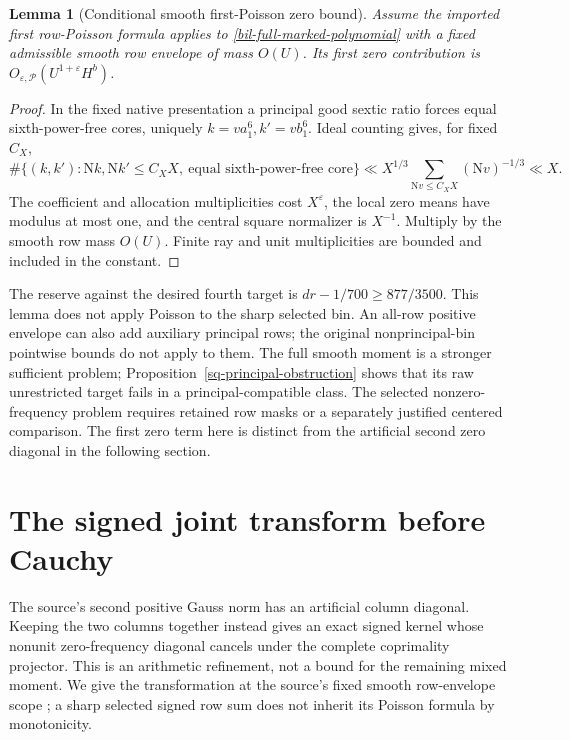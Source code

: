 \documentclass[11pt]{article}
\newtheorem{lemma}[theorem]{Lemma}
\theoremstyle{definition}
\newcommand{\N}{\mathrm N}
\newcommand{\eps}{\varepsilon}
\begin{document}
\begin{lemma}[Conditional smooth first-Poisson zero bound]
\label{bil-first-zero-bound}
Assume the imported first row-Poisson formula applies to
\eqref{bil-full-marked-polynomial} with a fixed admissible smooth row
envelope of mass $O(U)$. Its first zero contribution is
$O_{\eps,\mathcal P}(U^{1+\eps}H^b)$.
\end{lemma}
\begin{proof}
In the fixed native presentation a principal good sextic ratio forces
equal sixth-power-free cores, uniquely $k=v a_1^6,k'=v b_1^6$.
Ideal counting gives, for fixed $C_X$,
\[
 \#\{(k,k'): \N k,\N k'\le C_X X,\ \text{equal sixth-power-free core}\}
 \ll X^{1/3}\sum_{\N v\le C_X X}(\N v)^{-1/3}\ll X.
\]
The coefficient and allocation multiplicities cost $X^\eps$, the local
zero means have modulus at most one, and the central square normalizer
is $X^{-1}$. Multiply by the smooth row mass $O(U)$.
Finite ray and unit multiplicities are bounded and included in the constant.
\end{proof}
The reserve against the desired fourth target is
$dr-1/700\ge877/3500$. This lemma does not apply Poisson to the sharp
selected bin. An all-row positive envelope can also add auxiliary
principal rows; the original nonprincipal-bin pointwise bounds do not
apply to them. The full smooth moment is a stronger sufficient problem;
Proposition~\ref{sq-principal-obstruction} shows that its raw unrestricted
target fails in a principal-compatible class. The selected nonzero-frequency
problem requires retained row masks or a separately justified centered comparison.
The first zero term here is distinct from the artificial second zero
diagonal in the following section.

\section{The signed joint transform before Cauchy}
\label{sj-sec-transform}
The source's second positive Gauss norm has an artificial column diagonal.
Keeping the two columns together instead gives an exact signed kernel whose
nonunit zero-frequency diagonal cancels under the complete coprimality
projector.  This is an arithmetic refinement, not a bound for the remaining
mixed moment.  We give the transformation at the source's fixed smooth
row-envelope scope \cite{source-primary,n21}; a sharp selected signed row
sum does not inherit its Poisson formula by monotonicity.
\end{document}
